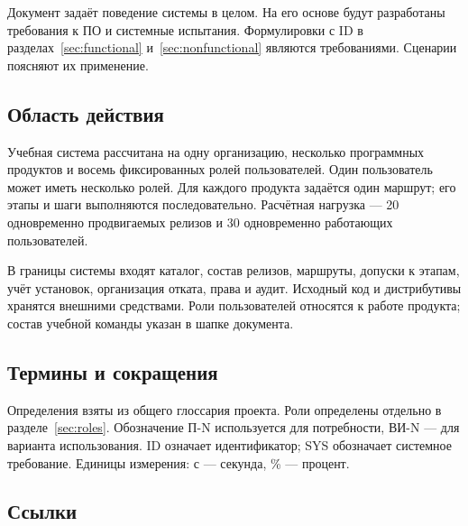 \documentclass{tpks}
\begin{document}
Документ задаёт поведение системы в целом. На его основе будут разработаны требования
к ПО и системные испытания. Формулировки с ID в разделах~\ref{sec:functional}
и~\ref{sec:nonfunctional} являются требованиями. Сценарии поясняют их применение.

\subsection{Область действия}

Учебная система рассчитана на одну организацию, несколько программных продуктов и восемь
фиксированных ролей пользователей. Один пользователь может иметь несколько ролей.
Для каждого продукта задаётся один маршрут; его этапы и шаги выполняются последовательно.
Расчётная нагрузка --- 20 одновременно продвигаемых релизов и 30 одновременно
работающих пользователей.

В границы системы входят каталог, состав релизов, маршруты, допуски к этапам,
учёт установок, организация отката, права и аудит. Исходный код и дистрибутивы хранятся
внешними средствами. Роли пользователей относятся к работе продукта;
состав учебной команды указан в шапке документа.

\subsection{Термины и сокращения}

Определения взяты из общего глоссария проекта. Роли определены отдельно в
разделе~\ref{sec:roles}. Обозначение П-N используется для потребности,
ВИ-N --- для варианта использования.
ID означает идентификатор; SYS обозначает системное требование.
Единицы измерения: с --- секунда, \% --- процент.


\subsection{Ссылки}
\end{document}
